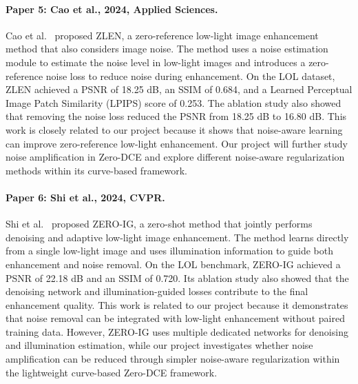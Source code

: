 \documentclass[11pt, letterpaper]{article}
\begin{document}
\paragraph{Paper 5: Cao et al., 2024, Applied Sciences.}
Cao et al.~\cite{cao2024zlen} proposed ZLEN, a zero-reference low-light image enhancement method that also considers image noise. The method uses a noise estimation module to estimate the noise level in low-light images and introduces a zero-reference noise loss to reduce noise during enhancement. On the LOL dataset, ZLEN achieved a PSNR of 18.25 dB, an SSIM of 0.684, and a Learned Perceptual Image Patch Similarity (LPIPS) score of 0.253. The ablation study also showed that removing the noise loss reduced the PSNR from 18.25 dB to 16.80 dB. This work is closely related to our project because it shows that noise-aware learning can improve zero-reference low-light enhancement. Our project will further study noise amplification in Zero-DCE and explore different noise-aware regularization methods within its curve-based framework.

\paragraph{Paper 6: Shi et al., 2024, CVPR.}
Shi et al.~\cite{shi2024zeroig} proposed ZERO-IG, a zero-shot method that jointly performs denoising and adaptive low-light image enhancement. The method learns directly from a single low-light image and uses illumination information to guide both enhancement and noise removal. On the LOL benchmark, ZERO-IG achieved a PSNR of 22.18 dB and an SSIM of 0.720. Its ablation study also showed that the denoising network and illumination-guided losses contribute to the final enhancement quality. This work is related to our project because it demonstrates that noise removal can be integrated with low-light enhancement without paired training data. However, ZERO-IG uses multiple dedicated networks for denoising and illumination estimation, while our project investigates whether noise amplification can be reduced through simpler noise-aware regularization within the lightweight curve-based Zero-DCE framework.
\end{document}
